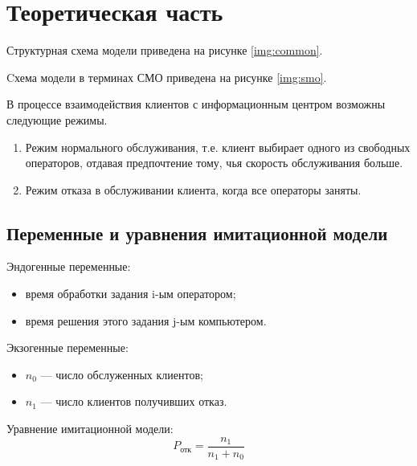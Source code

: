 \chapter{Теоретическая часть}

Структурная схема модели приведена на рисунке \ref{img:common}.

Cхема модели в терминах СМО приведена на рисунке \ref{img:smo}.

В процессе взаимодействия клиентов с информационным центром возможны следующие режимы.
\begin{enumerate}
	\item Режим нормального обслуживания, т.е. клиент выбирает одного из
	свободных операторов, отдавая предпочтение тому, чья скорость обслуживания больше.
	\item Режим отказа в обслуживании клиента, когда все операторы заняты.
\end{enumerate}

\clearpage
\section{Переменные и уравнения имитационной модели}

Эндогенные переменные:
\begin{itemize}
	\item время обработки задания i-ым оператором; 
	\item время решения этого задания j-ым компьютером.
\end{itemize}

Экзогенные переменные:
\begin{itemize}
	\item $n_0$ --- число обслуженных клиентов; 
	\item $n_1$ --- число клиентов получивших отказ.
\end{itemize}

Уравнение имитационной модели:
\begin{equation}
	P_{отк} = \frac{n_1}{n_1 + n_0}
\end{equation}
